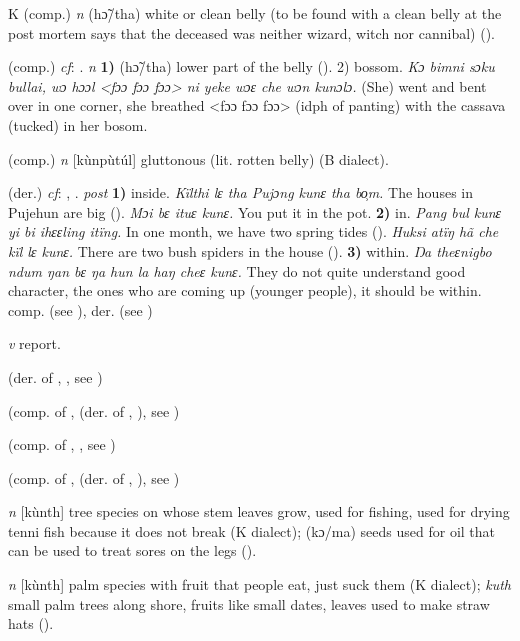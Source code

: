 \begin{letter}{K}
 (comp.) \textit{n} (hɔ̃/tha) white or clean belly (to be found with a clean belly at the post mortem says that the deceased was neither wizard, witch nor cannibal) (\citealt{Pichl1967}).

 (comp.) \textit{cf}: . \textit{n} \textbf{1)} (hɔ̃/tha) lower part of the belly (\citealt{Pichl1967}). 2) bossom. \textit{Kɔ bimni sɔku bullai, wɔ hɔɔl <fɔɔ fɔɔ fɔɔ> ni yeke wɔɛ che wɔn kunɔlɔ.} (She) went and bent over in one corner, she breathed <fɔɔ fɔɔ fɔɔ> (idph of panting) with the cassava (tucked) in her bosom.

 (comp.) \textit{n} [kùnpùtúl] gluttonous (lit. rotten belly) (B dialect).

 (der.) \textit{cf}: , . \textit{post} \textbf{1)} inside. \textit{Kïlthi lɛ tha Pujɔng kunɛ tha bo̹m.} The houses in Pujehun are big (\citealt{Pichl1967}). \textit{Mɔi bɛ ituɛ kunɛ.} You put it in the pot. \textbf{2)} in. \textit{Pang bul kunɛ yi bi ihɛɛling itïng.} In one month, we have two spring tides (\citealt{Pichl1967}). \textit{Huksi atïŋ hã che kïl lɛ kunɛ.} There are two bush spiders in the house (\citealt{Pichl1967}). \textbf{3)} within. \textit{Ŋa theɛnigbo ndum ŋan bɛ ŋa hun la haŋ cheɛ kunɛ.} They do not quite understand good character, the ones who are coming up (younger people), it should be within. comp.  (see ), der.  (see )

 \textit{v} report.

 (der. of , , see )

 (comp. of ,  (der. of , ), see ) 

 (comp. of , , see ) 

 (comp. of ,  (der. of , ), see ) 

\textit{n} [kùnth] tree species on whose stem leaves grow, used for fishing, used for drying tenni fish because it does not break (K dialect); (kɔ/ma) seeds used for oil that can be used to treat sores on the legs (\citealt{Pichl1967}). 

 \textit{n} [kùnth] palm species with fruit that people eat, just suck them (K dialect); \textit{kuth} small palm trees along shore, fruits like small dates, leaves used to make straw hats (\citealt{Pichl1967}).


\end{letter}
